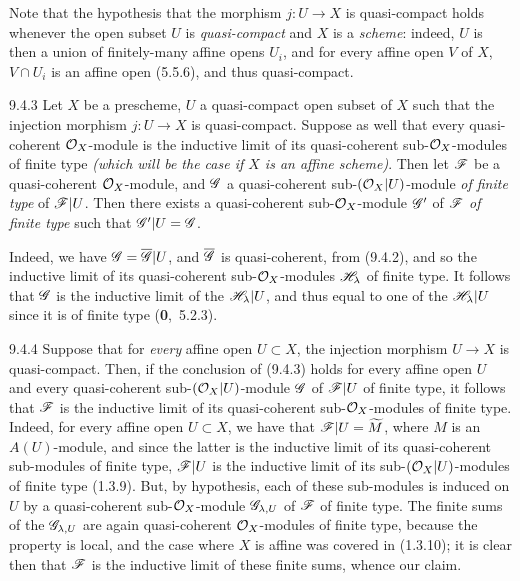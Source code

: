 \documentclass[../main.tex]{subfiles}
\begin{document}
Note that the hypothesis that the morphism $j\colon U\to X$ is quasi-compact holds whenever the open subset $U$ is \emph{quasi-compact} and $X$ is a \emph{scheme}: indeed, $U$ is then a union of finitely-many affine opens $U_i$, and for every affine open $V$ of $X$, $V\cap U_i$ is an affine open (5.5.6), and thus quasi-compact.

\begin{cx}[Corollary]{9.4.3}
    Let $X$ be a prescheme, $U$ a quasi-compact open subset of $X$ such that the injection morphism $j\colon U\to X$ is quasi-compact.
    Suppose as well that every quasi-coherent $\mathcal{O}_X$-module is the inductive limit of its quasi-coherent sub-$\mathcal{O}_X$-modules of finite type \emph{(which will be the case if $X$ is an \emph{affine scheme})}.
    Then let $\mathscr{F}$ be a quasi-coherent $\mathcal{O}_X$-module, and $\mathscr{G}$ a quasi-coherent sub-$(\mathcal{O}_X|U)$-module \emph{of finite type} of $\mathscr{F}|U$.
    Then there exists a quasi-coherent sub-$\mathcal{O}_X$-module $\mathscr{G}'$ of $\mathscr{F}$ \emph{of finite type} such that $\mathscr{G}'|U=\mathscr{G}$.
\end{cx}

Indeed, we have $\mathscr{G}=\overline{\mathscr{G}}|U$, and $\overline{\mathscr{G}}$ is quasi-coherent, from (9.4.2), and so the inductive limit of its quasi-coherent sub-$\mathcal{O}_X$-modules $\mathscr{H}_\lambda$ of finite type.
It follows that $\mathscr{G}$ is the inductive limit of the $\mathscr{H}_\lambda|U$, and thus equal to one of the $\mathscr{H}_\lambda|U$ since it is of finite type (\textbf{0},~5.2.3).

\begin{cx}[Remark]{9.4.4}
    Suppose that for \emph{every} affine open $U\subset X$, the injection morphism $U\to X$ is quasi-compact.
    Then, if the conclusion of (9.4.3) holds for every affine open $U$ and every quasi-coherent sub-$(\mathcal{O}_X|U)$-module $\mathscr{G}$ of $\mathscr{F}|U$ of finite type, it follows that $\mathscr{F}$ is the inductive limit of its quasi-coherent sub-$\mathcal{O}_X$-modules of finite type.
    Indeed, for every affine open $U\subset X$, we have that $\mathscr{F}|U=\widetilde{M}$, where $M$ is an $A(U)$-module, and since the latter is the inductive limit of its quasi-coherent sub-modules of finite type, $\mathscr{F}|U$ is the inductive limit of its sub-$(\mathcal{O}_X|U)$-modules of finite type (1.3.9).
    But, by hypothesis, each of these sub-modules is induced on $U$ by a quasi-coherent sub-$\mathcal{O}_X$-module $\mathscr{G}_{\lambda,U}$ of $\mathscr{F}$ of finite type.
    The finite sums of the $\mathscr{G}_{\lambda,U}$ are again quasi-coherent $\mathcal{O}_X$-modules of finite type, because the property is local, and the case where $X$ is affine was covered in (1.3.10); it is clear then that $\mathscr{F}$ is the inductive limit of these finite sums, whence our claim.
\end{cx}
\end{document}
